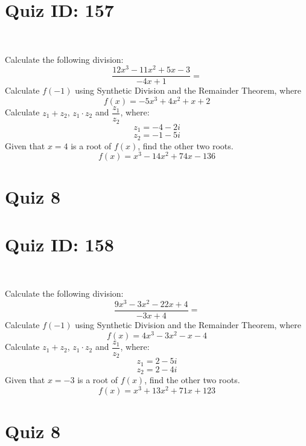 \documentclass{exam}
\begin{document}
\section*{Quiz ID: 157}
\vspace{0.5cm}\
\vspace{1cm}\
\begin{questions}
\question Calculate the following division:\[\dfrac{
12x^3 - 11x^2 + 5x - 3}{
-4x + 1}=\] \makeemptybox{\stretch{2}}
\question Calculate $f(-1)$ using Synthetic Division and the Remainder Theorem, where\[f(x) = 
-5x^3 + 4x^2 + x + 2\]
\newpage\question Calculate $z_1+z_2$, $z_1\cdot z_2$ and $\dfrac{z_1}{z_2}$, where:\[z_1=-4-2\mathit{i}\]\[z_2=-1-5\mathit{i}\]
\question Given that $x=4$ is a root of $f(x)$, find the other two roots.\[f(x)=
x^3 - 14x^2 + 74x - 136\]\makeemptybox{\stretch{1}}
\end{questions}\newpage
\newpage
\section*{Quiz 8}
\section*{Quiz ID: 158}
\vspace{0.5cm}\
\vspace{1cm}\
\begin{questions}
\question Calculate the following division:\[\dfrac{
9x^3 - 3x^2 - 22x + 4}{
-3x + 4}=\] 
\question Calculate $f(-1)$ using Synthetic Division and the Remainder Theorem, where\[f(x) = 
4x^3 - 3x^2 - x - 4\]
\newpage\question Calculate $z_1+z_2$, $z_1\cdot z_2$ and $\dfrac{z_1}{z_2}$, where:\[z_1=2-5\mathit{i}\]\[z_2=2-4\mathit{i}\]\makeemptybox{\stretch{1}}
\question Given that $x=-3$ is a root of $f(x)$, find the other two roots.\[f(x)=
x^3 + 13x^2 + 71x + 123\]\makeemptybox{\stretch{1}}
\end{questions}\newpage
\newpage
\section*{Quiz 8}
\end{document}
